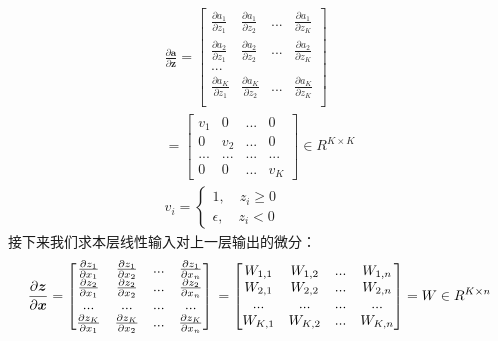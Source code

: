 \documentclass[UTF8]{article}
\begin{document}
\begin{equation}
\begin{aligned}
\frac{\partial{\boldsymbol{a}}}{\partial{\boldsymbol{z}}}=\begin{bmatrix}
 \frac{\partial{a_{1}}}{\partial{z_{1}}} & \frac{\partial{a_{1}}}{\partial{z_{2}}} & ... & \frac{\partial{a_{1}}}{\partial{z_{K}}} \\
 \frac{\partial{a_{2}}}{\partial{z_{1}}} & \frac{\partial{a_{2}}}{\partial{z_{2}}} & ... & \frac{\partial{a_{2}}}{\partial{z_{K}}} \\
 ... \\
 \frac{\partial{a_{K}}}{\partial{z_{1}}} & \frac{\partial{a_{K}}}{\partial{z_{2}}} & ... & \frac{\partial{a_{K}}}{\partial{z_{K}}} \\
 \end{bmatrix} \\
 =\begin{bmatrix}
 v_{1} & 0 & ... & 0 \\
 0 & v_{2} & ... & 0 \\
 ... & ... & ... & ... \\
 0 & 0 & ... & v_{K}
 \end{bmatrix} \in R^{K \times K} \\
 v_{i}=\begin{cases}
 1, \quad z_{i} \ge 0 \\
 \epsilon, \quad z_{i} < 0
 \end{cases}
\end{aligned}
\label{mlp-leaky-relu-pj-pz-def}
\end{equation}
接下来我们求本层线性输入对上一层输出的微分：
\begin{equation}
\frac{\partial{\boldsymbol{z}}}{\partial{\boldsymbol{x}}}=\begin{bmatrix}
\frac{\partial{z_{1}}}{\partial{x_{1}}} & \frac{\partial{z_{1}}}{\partial{x_{2}}} & ... & \frac{\partial{z_{1}}}{\partial{x_{n}}} \\
\frac{\partial{z_{2}}}{\partial{x_{1}}} & \frac{\partial{z_{2}}}{\partial{x_{2}}} & ... & \frac{\partial{z_{2}}}{\partial{x_{n}}} \\
... & ... & ... & ... \\
\frac{\partial{z_{K}}}{\partial{x_{1}}} & \frac{\partial{z_{K}}}{\partial{x_{2}}} & ... & \frac{\partial{z_{K}}}{\partial{x_{n}}} \\
\end{bmatrix} \\
=\begin{bmatrix}
W_{1,1} & W_{1,2} & ... & W_{1,n} \\
W_{2,1} & W_{2,2} & ... & W_{2,n} \\
... & ... & ... & ... \\
W_{K,1} & W_{K,2} & ... & W_{K,n}
\end{bmatrix}=W \in R^{K \times n}
\label{mlp-leaky-relu-pz-px-def}
\end{equation}
\end{document}
